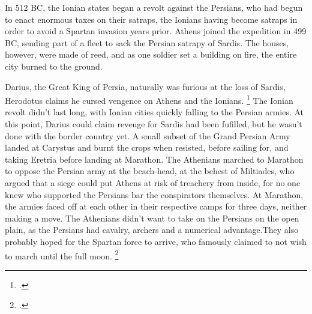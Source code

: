\documentclass[twoside, a4paper, 12pt]{article}
\begin{document}
\par\vspace{1em}

In 512 BC, the Ionian states began a revolt against the Persians, who had
begun to enact enormous taxes on their satraps, the Ionians having become
satraps in order to avoid a Spartan invasion years prior.\footnotemark
Athens joined the expedition in 499 BC, sending part of a fleet to sack the Persian
satrapy of Sardis. The houses, however, were made of reed, and as one soldier
set a building on fire, the entire city burned to the ground.\footnotemark[\value{footnote}]

\par\vspace{1em}

Darius, the Great King of Persia, naturally was furious at the loss of Sardis,
Herodotus claims he cursed vengence on Athens and the Ionians.
\footcite[Book 5.105]{herodotus_1920}
The Ionian revolt didn't last long, with Ionian cities quickly falling to the
Persian armies. At this point, Darius could claim revenge for Sardis had been
fufilled, but he wasn't done with the border country yet. A small subset of the
Grand Persian Army landed at Carystus and burnt the crops when resisted,
before sailing for, and taking Eretria before landing at Marathon.
\footnotemark
The Athenians marched to Marathon to oppose the Persian army at the beach-head,
at the behest of Miltiades, who argued that a siege could put Athens at risk of
treachery from inside, for no one knew who supported the Persians bar the
conspirators themselves. At Marathon, the armies faced off at each other in their
respective camps for three days, neither making a move. The Athenians didn't
want to take on the Persians on the open plain, as the Persians had cavalry,
archers and a numerical advantage.\footnotemark[\value{footnote}]
They also probably hoped for the Spartan force to arrive, who famously claimed
to not wish to march until the full moon.
\footcite[Book 6.106]{herodotus_1920}

\par\vspace{1em}
\end{document}
